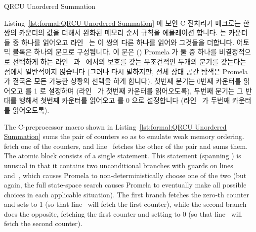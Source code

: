 \begin{listing}[htbp]

\caption{QRCU Unordered Summation}
\label{lst:formal:QRCU Unordered Summation}
\end{listing}

\begin{fcvref}
Listing~\ref{lst:formal:QRCU Unordered Summation}
에 보인 C 전처리기 매크로는 한쌍의 카운터의 값을 더해서 완화된 메모리 순서
규칙을 에뮬레이션 합니다.
 는 카운터들 중 하나를 읽어오고
라인~ 는 이 쌍의 다른 하나를 읽어와 그것들을 더합니다.
어토믹 블록은 하나의  문으로 구성됩니다.
이  문은 () Promela 가 둘 중 하나를 비결정적으로
선택하게 하는 라인~ 과~ 에서의 보호를 갖는 무조건적인
두개의 분기를 갖는다는 점에서 일반적이지 않습니다 (그러나 다시 말하지만, 전체
상태 공간 탐색은 Promela 가 결국은 모든 가능한 상황의 선택을 하게 합니다).
첫번째 분기는 0번째 카운터를 읽어오고  를 1 로 설정하며
(라인~ 가 첫번째 카운터를 읽어오도록), 두번째 분기는 그 반대를
행해서 첫번째 카운터를 읽어오고  를 0 으로 설정합니다
(라인~ 가 두번째 카운터를 읽어오도록).
\end{fcvref}

\iffalse

\begin{fcvref}
The C-preprocessor macro shown in
Listing~\ref{lst:formal:QRCU Unordered Summation}
sums the pair of counters so as to emulate weak memory ordering.
 fetch one of the counters,
and line~ fetches the other
of the pair and sums them.
The atomic block consists of a single  statement.
This  statement (spanning ) is unusual in that
it contains two unconditional
branches with guards on lines~ and~, which causes Promela to
non-deterministically choose one of the two (but again, the full
state-space search causes Promela to eventually make all possible
choices in each applicable situation).
The first branch fetches the zero-th counter and sets  to 1 (so
that line~ will fetch the first counter), while the second
branch does the opposite, fetching the first counter and setting 
to 0 (so that line~ will fetch the second counter).
\end{fcvref}

